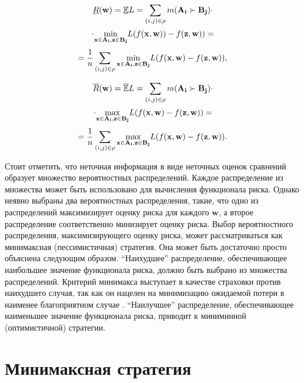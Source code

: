 \documentclass[12pt,a4paper,oneside]{article}
\begin{document}
\begin{multicols}{2}
\[
\underline{R}(\mathbf{w}) = \mathbb{\underline{E}}L = \sum \limits_{(i,j) \in \mathrm{\rho}} m(\mathbf{A_i} \succ \mathbf{B_j}) \cdot 
\]
\[
\cdot \underset{%
	\mathbf{x} \in \mathbf{A_i}, \mathbf{z} \in \mathbf{B_j}%
}{\operatorname{min}} %
L(f(\mathbf{x}, \mathbf{w})) - f(\mathbf{z}, \mathbf{w})) = 
\]
\[
= \frac{1}{n} \sum \limits_{(i,j) \in \Rho} \underset{%
\mathbf{x} \in \mathbf{A_i}, \mathbf{z} \in \mathbf{B_j}%
}{\operatorname{min}}%
L(f(\mathbf{x}, \mathbf{w}) - f(\mathbf{z}, \mathbf{w})),
\]

\[
\overline{R}(\mathbf{w}) = \mathbb{\overline{E}} L = \sum \limits_{(i,j) \in \mathrm{\rho}} m(\mathbf{A_i} \succ \mathbf{B_j}) \cdot 
\]
\[ 
\cdot \underset{%
	\mathbf{x} \in \mathbf{A_i}, \mathbf{z} \in \mathbf{B_j}%
}{\operatorname{max}}
L (f (\mathbf{x}, \mathbf{w}) - f(\mathbf{z}, \mathbf{w})) = 
\]
\[
= \frac{1}{n} \sum \limits_{(i,j) \in \Rho} \underset{%
	\mathbf{x} \in \mathbf{A_i}, \mathbf{z} \in \mathbf{B_j}%
}{\operatorname{max}}%
L (f(\mathbf{x}, \mathbf{w}) - f(\mathbf{z}, \mathbf{w})).
\]

\par
Стоит отметить, что неточная информация в виде неточных оценок сравнений образует множество вероятностных распределений. 
Каждое распределение из множества может быть использовано для вычисления функционала риска.
Однако неявно выбраны два вероятностных распределения, такие, что одно из распределений максимизирует оценку риска для каждого \(\mathbf{w}\), а второе распределение соответственно минизирует оценку риска. 
Выбор вероятностного распределения, максимизирующего оценку риска, может рассматриваться как минимаксная (пессимистичная) стратегия. 
Она может быть достаточно просто объяснена следующим образом. 
``Наихудшее'' распределение, обеспечивающее наибольшее значение функционала риска, должно быть выбрано из множества распределений. 
Критерий минимакса выступает в качестве страховки против наихудшего случая, так как он нацелен на минимизацию ожидаемой потери в наименее благоприятном случае . 
``Наилучшее'' распределение, обеспечивающее наименьшее значение функционала риска, приводит к миниминной (оптимистичной) стратегии.


\vspace*{1em}
\chapter{Минимаксная стратегия}


\end{multicols}
\end{document}
